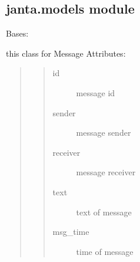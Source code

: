 \documentclass[letterpaper,10pt,english]{sphinxmanual}
\begin{document}
\subsection{janta.models module}
\label{\detokenize{janta:module-janta.models}}\label{\detokenize{janta:janta-models-module}}

\begin{fulllineitems}
\label{\detokenize{janta:janta.models.Messages}}
Bases: 

this class for Message
Attributes:
\begin{quote}
\begin{quote}\begin{description}
\item[{id}] \leavevmode
message id

\item[{sender}] \leavevmode
message sender

\item[{receiver}] \leavevmode
message receiver

\item[{text}] \leavevmode
text of message

\item[{msg\_time}] \leavevmode
time of message

\end{description}\end{quote}
\end{quote}

\begin{fulllineitems}
\label{\detokenize{janta:janta.models.Messages.set_message}}
\end{fulllineitems}


\end{fulllineitems}

\end{document}
